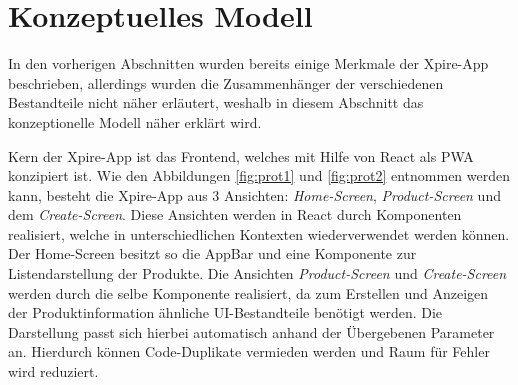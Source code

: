 \section{Konzeptuelles Modell}

In den vorherigen Abschnitten wurden bereits einige Merkmale der Xpire-App beschrieben, allerdings wurden die Zusammenhänger der verschiedenen Bestandteile nicht näher erläutert, weshalb in diesem Abschnitt das konzeptionelle Modell näher erklärt wird. 

Kern der Xpire-App ist das Frontend, welches mit Hilfe von React als PWA konzipiert ist. Wie den Abbildungen \ref{fig:prot1} und \ref{fig:prot2} entnommen werden kann, besteht die Xpire-App aus 3 Ansichten: \textit{Home-Screen}, \textit{Product-Screen} und dem \textit{Create-Screen}. Diese Ansichten werden in React durch Komponenten realisiert, welche in unterschiedlichen Kontexten wiederverwendet werden können. Der Home-Screen besitzt so die AppBar und eine Komponente zur Listendarstellung der Produkte. Die Ansichten \textit{Product-Screen} und \textit{Create-Screen} werden durch die selbe Komponente realisiert, da zum Erstellen und Anzeigen der Produktinformation ähnliche UI-Bestandteile benötigt werden. Die Darstellung passt sich hierbei automatisch anhand der Übergebenen Parameter an. Hierdurch können Code-Duplikate vermieden werden und Raum für Fehler wird reduziert. 